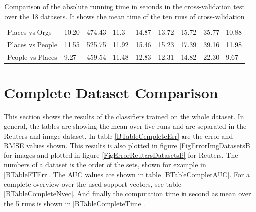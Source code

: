 \begin{table}[]
{\begin{tabular}{@{}lllllllll@{}}
			Places vs Orgs        & 10.20 & 474.43 & 11.3 & 14.87         & 13.72 & 15.72 & 35.77 & 10.88 \\
			Places vs People      & 11.55 & 525.75 & 11.92 & 15.46         & 15.23 & 17.39 & 39.16 & 11.98 \\
			People vs Places      & 9.27  & 459.54 & 11.48 & 12.83         & 12.31 & 14.82 & 22.30 & 9.67  \\ \bottomrule
	\end{tabular}}
	\caption[Time comparison from cross-validation]{Comparison of the absolute running time in seconds in the cross-validation test over the 18 datasets. It shows the mean time of the ten runs of cross-validation\label{BTableFTTime}}
\end{table}
\section{Complete Dataset Comparison}\label{BSecCom}
This section shows the results of the classifiers trained on the whole dataset. 
In general, the tables are showing the mean over five runs and are separated in the Reuters and image dataset.
In table \ref{BTableCompleteErr} are the error and \acs{RMSE} values shown.
This results is also plotted in figure \ref{FigErrorImgDatasetsB} for images and plotted in figure \ref{FigErrorReutersDatasetsB} for Reuters.
The numbers of a dataset is the order of the sets, shown for example in \ref{BTableFTErr}.
The \acs{AUC} values are shown in table \ref{BTableCompletAUC}.
For a complete overview over the used support vectors, see table \ref{BTableCompleteNvec}.
And finally the computation time in second as mean over the 5 runs is shown in \ref{BTableCompleteTime}. 
